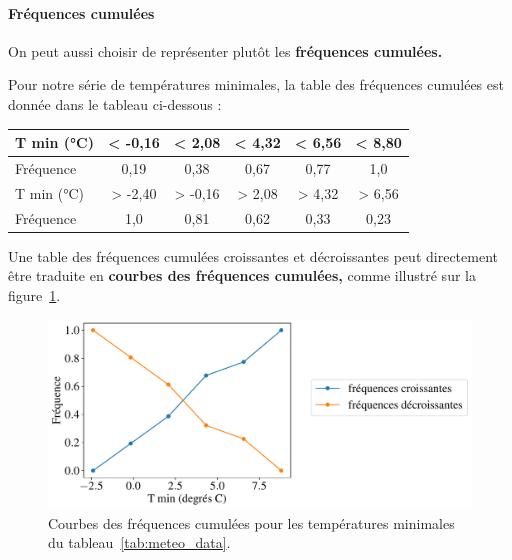 \paragraph{Fréquences cumulées} 
On peut aussi choisir de représenter plutôt les \textbf{fréquences cumulées.} 

\begin{exemple}
  Pour notre série de températures minimales, la table des fréquences cumulées
  est donnée dans le tableau ci-dessous : \par %

    \centering
    \begin{tabular}[h]{|l|c|c|c|c|c|} \hline 
      T min (\si{\celsius}) & < -0,16 & < 2,08 & < 4,32 & < 6,56 & < 8,80 \\ \hline 
      Fréquence & 0,19 & 0,38 & 0,67 & 0,77 & 1,0 \\ \hline
      T min (\si{\celsius}) & > -2,40 & > -0,16 & > 2,08 & > 4,32 & > 6,56 \\ \hline 
      Fréquence & 1,0 & 0,81 & 0,62 & 0,33 & 0,23 \\ \hline
    \end{tabular}

\end{exemple}

Une table des fréquences cumulées croissantes et décroissantes peut
directement être traduite en \textbf{courbes des fréquences cumulées,} comme
illustré sur la figure~\ref{fig:meteo_tmin_cumul_freq}.
\begin{figure}[h]
  \centering
  \includegraphics[width=.8\textwidth]{figures/stats/meteo_tmin_cumul_freq}
  \caption{Courbes des fréquences cumulées pour les températures minimales du
    tableau~\ref{tab:meteo_data}.}
  \label{fig:meteo_tmin_cumul_freq}
\end{figure}

